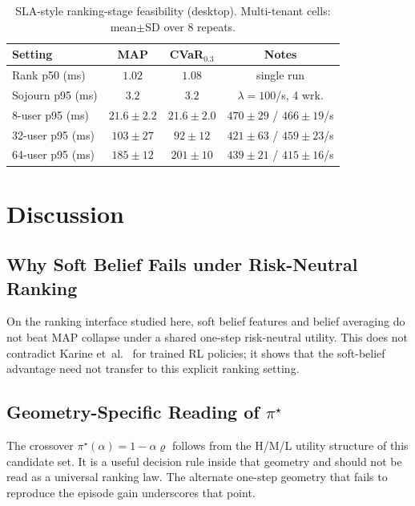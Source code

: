 \documentclass[journal]{IEEEtran}
\begin{document}
\begin{table}[t]
\centering
\caption{SLA-style ranking-stage feasibility (desktop). Multi-tenant cells: mean\(\pm\)SD over \(8\) repeats.}
\label{tab:sla}
\scriptsize
\setlength{\tabcolsep}{3.2pt}
\begin{tabular}{@{}lccc@{}}
\toprule
Setting & MAP & CVaR\(_{0.3}\) & Notes \\
\midrule
Rank p50 (ms) & \(1.02\) & \(1.08\) & single run \\
Sojourn p95 (ms) & \(3.2\) & \(3.2\) & \(\lambda{=}100\)/s, 4 wrk. \\
8-user p95 (ms) & \(21.6\pm2.2\) & \(21.6\pm2.0\) & \(470\pm29\) / \(466\pm19\)/s \\
32-user p95 (ms) & \(103\pm27\) & \(92\pm12\) & \(421\pm63\) / \(459\pm23\)/s \\
64-user p95 (ms) & \(185\pm12\) & \(201\pm10\) & \(439\pm21\) / \(415\pm16\)/s \\
\bottomrule
\end{tabular}
\end{table}

\section{Discussion}
\label{sec:discussion}

\subsection{Why Soft Belief Fails under Risk-Neutral Ranking}
On the ranking interface studied here, soft belief features and belief averaging do not beat MAP collapse under a shared one-step risk-neutral utility.
This does not contradict Karine et~al.~\cite{karine2023uai} for trained RL policies; it shows that the soft-belief advantage need not transfer to this explicit ranking setting.

\subsection{Geometry-Specific Reading of \texorpdfstring{\(\pi^\star\)}{pi*}}
The crossover \(\pi^\star(\alpha)=1-\alpha\varrho\) follows from the H/M/L utility structure of this candidate set.
It is a useful decision rule inside that geometry and should not be read as a universal ranking law.
The alternate one-step geometry that fails to reproduce the episode gain underscores that point.
\end{document}
